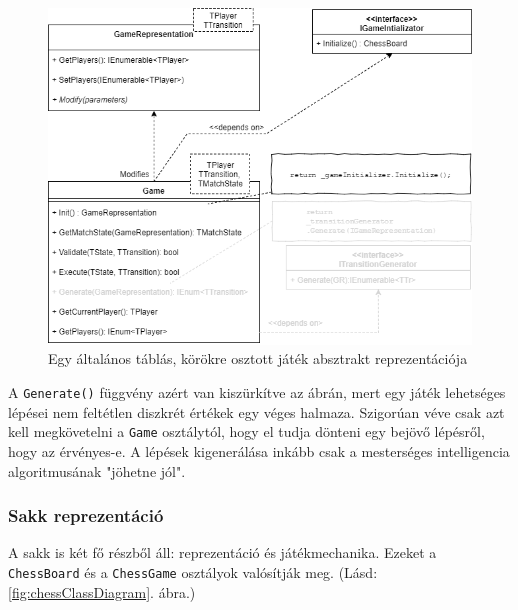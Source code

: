 \documentclass[twoside, a4paper, 12pt]{article}
\begin{document}
\begin{figure}[htbp]
	\centering
	\includegraphics[width=\textwidth]{img/boardGameAbstractClassDiagram.png}
	\caption{Egy általános táblás, körökre osztott játék absztrakt reprezentációja}
	\label{fig:boardGameAbstractClassDiagram}
\end{figure}

A \texttt{Generate()} függvény azért van kiszürkítve az ábrán, mert egy játék lehetséges lépései nem feltétlen diszkrét értékek egy véges halmaza. Szigorúan véve csak azt kell megkövetelni a \texttt{Game} osztálytól, hogy el tudja dönteni egy bejövő lépésről, hogy az érvényes-e. A lépések kigenerálása inkább csak a mesterséges intelligencia algoritmusának "jöhetne jól".

\subsubsection{Sakk reprezentáció}
A sakk is két fő részből áll: reprezentáció és játékmechanika. Ezeket a \texttt{ChessBoard} és a \texttt{ChessGame} osztályok valósítják meg. (Lásd: \ref{fig:chessClassDiagram}. ábra.)
\end{document}
